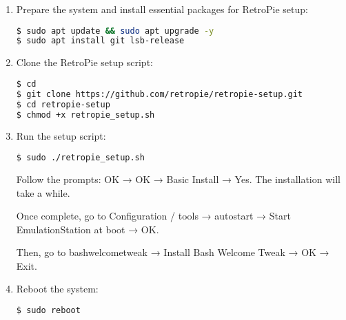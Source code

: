 \begin{enumerate}
\item Prepare the system and install essential packages for RetroPie setup:
\begin{lstlisting}[language=bash, breaklines=true, breakatwhitespace=true, columns=fullflexible]
$ sudo apt update && sudo apt upgrade -y
$ sudo apt install git lsb-release
\end{lstlisting}

\item Clone the RetroPie setup script:
\begin{lstlisting}[language=bash, breaklines=true, breakatwhitespace=true, columns=fullflexible]
$ cd
$ git clone https://github.com/retropie/retropie-setup.git
$ cd retropie-setup
$ chmod +x retropie_setup.sh
\end{lstlisting}

\item Run the setup script:
\begin{lstlisting}[language=bash, breaklines=true, breakatwhitespace=true, columns=fullflexible]
$ sudo ./retropie_setup.sh
\end{lstlisting}
Follow the prompts: OK → OK → Basic Install → Yes. The installation will take a while.

Once complete, go to Configuration / tools → autostart → Start EmulationStation at boot → OK.

Then, go to bashwelcometweak → Install Bash Welcome Tweak → OK → Exit.

\item Reboot the system:
\begin{lstlisting}[language=bash, breaklines=true, breakatwhitespace=true, columns=fullflexible]
$ sudo reboot
\end{lstlisting}


\end{enumerate}
